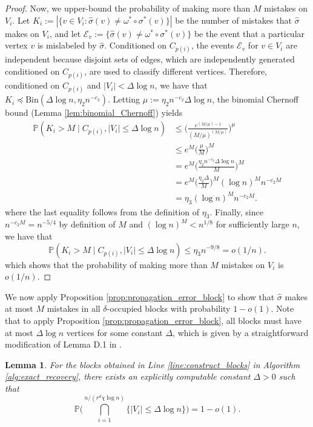 \documentclass{article}
\renewcommand{\P}{\mathbb{P}}
\newcommand{\1}{\mathbbm{1}}
\newcommand{\calE}{\mathcal{E}}
\theoremstyle{definition}
\theoremstyle{plain}
\newtheorem{lemma}{Lemma}
\begin{document}
\begin{proof}
Now, we upper-bound the probability of making more than $M$ mistakes on $V_i$. Let $K_i := |\{v \in V_i: \hat{\sigma}(v) \neq \omega^* \circ \sigma^*(v)\}|$ be the number of mistakes that $\hat{\sigma}$ makes on $V_i$, and let $\calE_v := \{\hat{\sigma}(v) \neq \omega^* \circ \sigma^*(v)\}$ be the event that a particular vertex $v$ is mislabeled by $\hat{\sigma}$. Conditioned on $C_{p(i)}$, the events $\calE_v$ for $v \in V_i$ are independent because disjoint sets of edges, which are independently generated conditioned on $C_{p(i)}$, are used to classify different vertices. Therefore, conditioned on $C_{p(i)}$ and $|V_i| < \Delta \log n$, we have that $K_i \preceq \text{Bin}(\Delta \log n, \eta_2 n^{-c_2})$. Letting $\mu := \eta_2 n^{-c_2} \Delta \log n$, the binomial Chernoff bound (Lemma \ref{lem:binomial_Chernoff}) yields
\begin{equation*}
\begin{aligned}
    \P(K_i > M \mid C_{p(i)}, |V_i| \leq \Delta \log n) &\leq \bigg(\frac{e^{(M/\mu) - 1}}{(M/\mu)^{(M/\mu)}}\bigg)^\mu \\
    &\leq e^M \Big(\frac{\mu}{M}\Big)^M \\
    &= e^M \Big(\frac{\eta_2 n^{-c_2} \Delta \log n}{M}\Big)^M \\
    &= e^M \Big(\frac{\eta_2 \Delta}{M}\Big)^M (\log n)^M n^{-c_2 M} \\
    &= \eta_3 (\log n)^M n^{-c_2 M}.
\end{aligned}
\end{equation*}
where the last equality follows from the definition of $\eta_3$. Finally, since $n^{-c_2 M} = n^{-5/4}$ by definition of $M$ and $(\log n)^M < n^{1/8}$ for sufficiently large $n$, we have that
\begin{equation*}
    \P(K_i > M \mid C_{p(i)}, |V_i| \leq \Delta \log n) \leq \eta_3 n^{-9/8} = o(1/n).
\end{equation*}
which shows that the probability of making more than $M$ mistakes on $V_i$ is $o(1/n)$.
\end{proof}

We now apply Proposition \ref{prop:propagation_error_block} to show that $\hat{\sigma}$ makes at most $M$ mistakes in all $\delta$-occupied blocks with probability $1 - o(1)$. Note that to apply Proposition \ref{prop:propagation_error_block}, all blocks must have at most $\Delta \log n$ vertices for some constant $\Delta$, which is given by a straightforward modification of Lemma D.1 in \cite{Gaudio+2024}.
\begin{lemma}
\label{lem:maximum_vertices_per_block}
    For the blocks obtained in Line \ref{line:construct_blocks} in Algorithm \ref{alg:exact_recovery}, there exists an explicitly computable constant $\Delta > 0$ such that 
    \begin{equation*}
        \P\bigg( \bigcap_{i = 1}^{n / (r^d \chi \log n)} \Big\{ |V_i| \leq \Delta \log n \Big\} \bigg) = 1 - o(1).
    \end{equation*}
\end{lemma}
\end{document}
